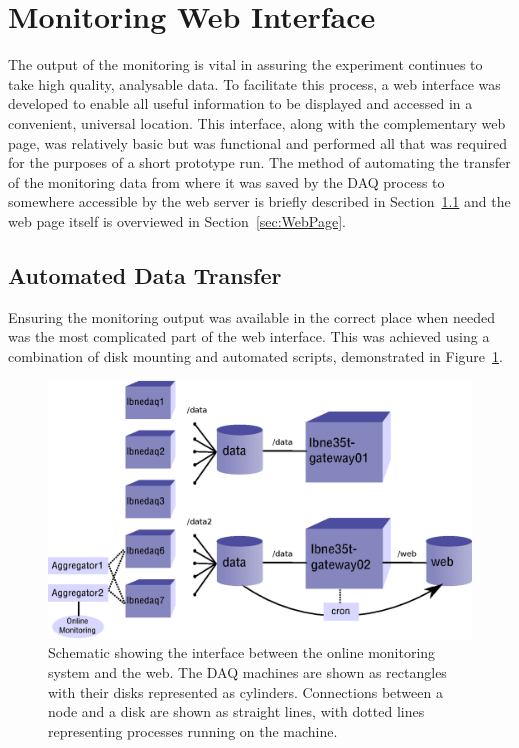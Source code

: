 \section{Monitoring Web Interface}\label{sec:WebInterface}

The output of the monitoring is vital in assuring the experiment continues to take high quality, analysable data.  To facilitate this process, a web interface was developed to enable all useful information to be displayed and accessed in a convenient, universal location.  This interface, along with the complementary web page, was relatively basic but was functional and performed all that was required for the purposes of a short prototype run.  The method of automating the transfer of the monitoring data from where it was saved by the DAQ process to somewhere accessible by the web server is briefly described in Section~\ref{sec:AutomatedDataTransfer} and the web page itself is overviewed in Section~\ref{sec:WebPage}.

\subsection{Automated Data Transfer}\label{sec:AutomatedDataTransfer}

Ensuring the monitoring output was available in the correct place when needed was the most complicated part of the web interface.  This was achieved using a combination of disk mounting and automated scripts, demonstrated in Figure~\ref{fig:WebInterface}.

\begin{figure}
  \centering
  \includegraphics[width=12cm]{webInterface.eps}
  \caption[Schematic showing the interface between the online monitoring system and the web.]{Schematic showing the interface between the online monitoring system and the web.  The DAQ machines are shown as rectangles with their disks represented as cylinders.  Connections between a node and a disk are shown as straight lines, with dotted lines representing processes running on the machine.}
  \label{fig:WebInterface}
\end{figure}

